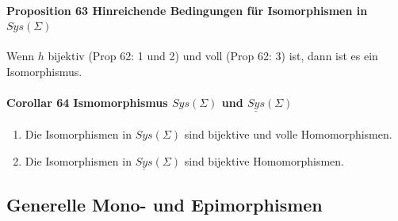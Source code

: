 \paragraph{Proposition 63 Hinreichende Bedingungen für Isomorphismen in $Sys(\Sigma)$}
Wenn $h$ bijektiv (Prop 62: 1 und 2) und voll (Prop 62: 3) ist, dann ist es ein Isomorphismus.

\paragraph{Corollar 64 Ismomorphismus $Sys(\Sigma)$ und $\underline{Sys}(\Sigma)$ }
\begin{enumerate}
\item Die Isomorphismen in $Sys(\Sigma)$ sind bijektive und volle Homomorphismen.
\item Die Isomorphismen in $\underline{Sys}(\Sigma)$ sind bijektive Homomorphismen.
\end{enumerate}

\subsection{Generelle Mono- und Epimorphismen}


